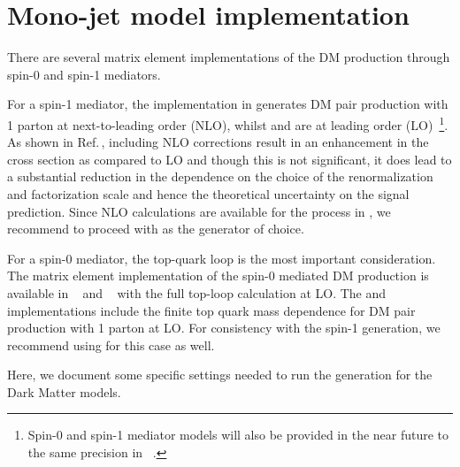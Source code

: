 \section{Mono-jet model implementation}


There are several matrix element implementations of the
DM production through spin-0 and spin-1 mediators.

For a spin-1 mediator, the implementation in \powheg generates
DM pair production with 1 parton at next-to-leading order (NLO), whilst \madgraph and \mcfm are at leading order (LO)~\footnote{Spin-0 and spin-1 mediator models will also be provided 
in the near future to the same precision in \madgraph~\cite{Alwall:1405.0301}.}. As shown in \powheg Ref.\,\cite{Haisch:2013ata}, including NLO corrections result in an enhancement in the cross section as compared to LO and though this is not significant, it does lead to a substantial reduction in the dependence on the choice of the renormalization and factorization scale and hence the theoretical uncertainty on the signal prediction. 
Since NLO calculations are available for the process in \powheg, we recommend to proceed with \powheg as the generator of choice. 

For a spin-0 mediator, the top-quark loop is the most important
consideration.
The matrix element implementation of the \schannel spin-0 mediated DM production is available in \mcfm~\cite{Fox:2012ru,Harris:2014hga} and \powheg~\cite{Haisch:2015ioa} with the full top-loop calculation at LO.
The \powheg and \mcfm implementations include the finite
top quark mass dependence for DM pair production with 1 parton at LO.
For consistency with the spin-1 generation, we recommend using \powheg
for this case as well.

Here, we document some specific settings needed to run the \powheg 
generation for the Dark Matter models.

